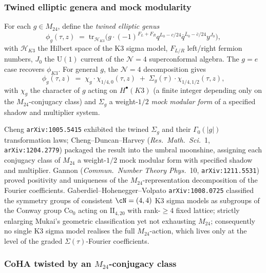 \subsubsection{Twined elliptic genera and mock modularity}
\label{subsec:twined-mock}

For each $g \in M_{24}$, define the \emph{twined elliptic genus}
\[
\phi_g(\tau, z) \;=\; \mathrm{tr}_{\mathcal{H}_{K3}}\bigl(g \cdot (-1)^{F_L + F_R} q^{L_0 - c/24} \overline{q}^{\bar{L}_0 - \bar{c}/24} y^{J_0}\bigr),
\]
with $\mathcal{H}_{K3}$ the Hilbert space of the K3 sigma model, $F_{L/R}$ left/right fermion numbers, $J_0$ the $\mathrm{U}(1)$ current of the $\mathcal{N}=4$ superconformal algebra. The $g = e$ case recovers $\phi_{K3}$. For general $g$, the $\mathcal{N}=4$ decomposition gives
\[
\phi_g(\tau, z) \;=\; \chi_g \cdot \chi_{1/4, 0}(\tau, z) \;+\; \Sigma_g(\tau) \cdot \chi_{1/4, 1/2}(\tau, z),
\]
with $\chi_g$ the character of $g$ acting on $H^\bullet(K3)$ (a finite integer depending only on the $M_{24}$-conjugacy class) and $\Sigma_g$ a weight-$1/2$ \emph{mock modular form} of a specified shadow and multiplier system.

Cheng \texttt{arXiv:1005.5415} exhibited the twined $\Sigma_g$ and their $\Gamma_0(|g|)$ transformation laws; Cheng--Duncan--Harvey (\emph{Res.\ Math.\ Sci.}\ 1, \texttt{arXiv:1204.2779}) packaged the result into the umbral moonshine, assigning each conjugacy class of $M_{24}$ a weight-$1/2$ mock modular form with specified shadow and multiplier. Gannon (\emph{Commun.\ Number Theory Phys.}\ 10, \texttt{arXiv:1211.5531}) proved positivity and uniqueness of the $M_{24}$-representation decomposition of the Fourier coefficients. Gaberdiel--Hohenegger--Volpato \texttt{arXiv:1008.0725} classified the symmetry groups of consistent $\cN = (4, 4)$ K3 sigma models as subgroups of the Conway group $\mathrm{Co}_0$ acting on $\mathrm{II}_{4, 20}$ with rank-$\geq 4$ fixed lattice; strictly enlarging Mukai's geometric classification yet not exhausting $M_{24}$; consequently no single K3 sigma model realises the full $M_{24}$-action, which lives only at the level of the graded $\Sigma(\tau)$-Fourier coefficients.

\subsubsection{CoHA twisted by an \texorpdfstring{$M_{24}$}{M24}-conjugacy class}
\label{subsec:coha-m24-twist}

